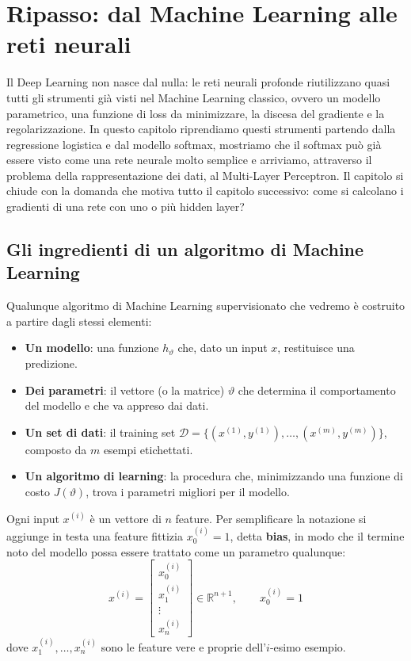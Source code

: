 \chapter{Ripasso: dal Machine Learning alle reti neurali}\label{ch:ripasso}
Il Deep Learning non nasce dal nulla: le reti neurali profonde riutilizzano quasi tutti gli strumenti già visti nel Machine Learning classico, ovvero un modello parametrico, una funzione di loss da minimizzare, la discesa del gradiente e la regolarizzazione. In questo capitolo riprendiamo questi strumenti partendo dalla regressione logistica e dal modello softmax, mostriamo che il softmax può già essere visto come una rete neurale molto semplice e arriviamo, attraverso il problema della rappresentazione dei dati, al Multi-Layer Perceptron. Il capitolo si chiude con la domanda che motiva tutto il capitolo successivo: come si calcolano i gradienti di una rete con uno o più hidden layer?

\section{Gli ingredienti di un algoritmo di Machine Learning}
Qualunque algoritmo di Machine Learning supervisionato che vedremo è costruito a partire dagli stessi elementi:
\begin{itemize}
    \item \textbf{Un modello}: una funzione $h_\vartheta$ che, dato un input $x$, restituisce una predizione.
    \item \textbf{Dei parametri}: il vettore (o la matrice) $\vartheta$ che determina il comportamento del modello e che va appreso dai dati.
    \item \textbf{Un set di dati}: il training set $\mathcal{D} = \{(x^{(1)}, y^{(1)}), \dots, (x^{(m)}, y^{(m)})\}$, composto da $m$ esempi etichettati.
    \item \textbf{Un algoritmo di learning}: la procedura che, minimizzando una funzione di costo $J(\vartheta)$, trova i parametri migliori per il modello.
\end{itemize}

Ogni input $x^{(i)}$ è un vettore di $n$ feature. Per semplificare la notazione si aggiunge in testa una feature fittizia $x_0^{(i)} = 1$, detta \textbf{bias}, in modo che il termine noto del modello possa essere trattato come un parametro qualunque:
\[
x^{(i)} = \begin{bmatrix} x_0^{(i)} \\ x_1^{(i)} \\ \vdots \\ x_n^{(i)} \end{bmatrix} \in \mathbb{R}^{n+1}, \qquad x_0^{(i)} = 1
\]
dove $x_1^{(i)}, \dots, x_n^{(i)}$ sono le feature vere e proprie dell'$i$-esimo esempio.

